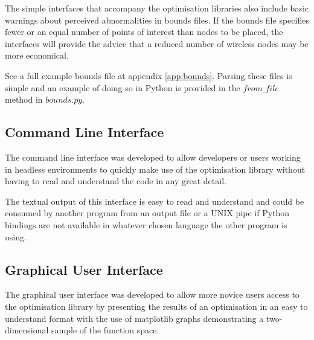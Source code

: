 		The simple interfaces that accompany the optimisation libraries also include basic warnings about perceived abnormalities in bounds files. If the bounds file specifies fewer or an equal number of points of interest than nodes to be placed, the interfaces will provide the advice that a reduced number of wireless nodes may be more economical.
		
		
		
		See a full example bounds file at appendix \ref{app:bounds}. Parsing these files is simple and an example of doing so in Python is provided in the $from\_file$ method in $bounds.py$.

	\subsection{Command Line Interface}  
		\label{sec:software_cli} 
		The command line interface was developed to allow developers or users working in headless environments to quickly make use of the optimisation library without having to read and understand the code in any great detail.

		The textual output of this interface is easy to read and understand and could be consumed by another program from an output file or a UNIX pipe if Python bindings are not available in whatever chosen language the other program is using.

	\subsection{Graphical User Interface} 
		\label{sec:software_gui} 
		The graphical user interface was developed to allow more novice users access to the optimisation library by presenting the results of an optimisation in an easy to understand format with the use of matplotlib graphs demonstrating a two-dimensional sample of the function space.

